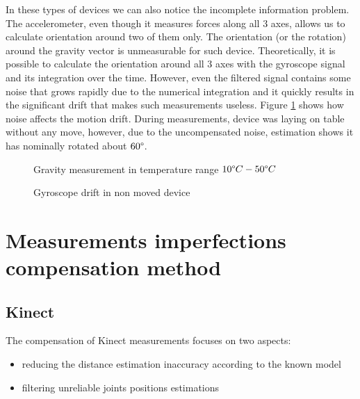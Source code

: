 \documentclass{llncs}
\begin{document}
In these types of devices we can also notice the incomplete information problem. The accelerometer, even though it measures forces along all 3 axes, allows us to calculate orientation around two of them only. The orientation (or the rotation) around the gravity vector is unmeasurable for such device. Theoretically, it is possible to calculate the orientation around all 3 axes with the gyroscope signal and its integration over the time. However, even the filtered signal contains some noise that grows rapidly due to the numerical integration and it quickly results in the significant drift that makes such measurements useless. Figure \ref{fig:characteristics:imu:gyroDrift} shows how noise affects the motion drift. During measurements, device was laying on table without any move, however, due to the uncompensated noise, estimation shows it has nominally rotated about $60\degree$.

\begin{figure}[h!]
	\centering 
	\begin{minipage}[b]{0.49\linewidth}
		\centering 
		\vspace{2.5cm}
		\caption{Gravity measurement in temperature range $10\degree C - 50\degree C$}
		\label{fig:characteristics:imu:imuTemp}
	\end{minipage}
	\begin{minipage}[b]{0.49\linewidth}
		\centering 
		\vspace{2.5cm}
		\caption{Gyroscope drift in non moved device}
		\label{fig:characteristics:imu:gyroDrift}
	\end{minipage}
\end{figure}

\section{Measurements imperfections compensation method}
\subsection{Kinect}
The compensation of Kinect measurements focuses on two aspects:
\begin{itemize}
	\item reducing the distance estimation inaccuracy according to the known model
	\item filtering unreliable joints positions estimations
\end{itemize}
\end{document}
